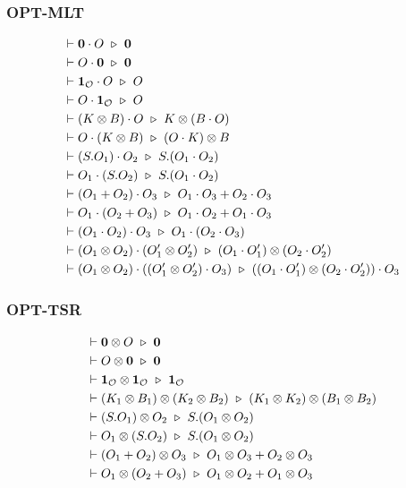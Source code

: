 \subsubsection*{\textsf{OPT-MLT}}
\begin{align*}
  & \vdash \mathbf{0} \cdot O \ \triangleright\  \mathbf{0} \\
  & \vdash O \cdot \mathbf{0} \ \triangleright\  \mathbf{0} \\
  & \vdash \mathbf{1}_\mathcal{O} \cdot O \ \triangleright\  O \\
  & \vdash O \cdot \mathbf{1}_\mathcal{O} \ \triangleright\  O \\
  & \vdash (K \otimes B) \cdot O \ \triangleright\  K \otimes (B \cdot O)\\
  & \vdash O \cdot (K \otimes B) \ \triangleright\  (O \cdot K) \otimes B\\
  & \vdash (S.O_1) \cdot O_2 \ \triangleright\  S.(O_1 \cdot O_2) \\
  & \vdash O_1 \cdot (S.O_2) \ \triangleright\  S.(O_1 \cdot O_2) \\
  & \vdash (O_1 + O_2) \cdot O_3 \ \triangleright\  O_1 \cdot O_3 + O_2 \cdot O_3 \\
  & \vdash O_1 \cdot (O_2 + O_3) \ \triangleright\  O_1 \cdot O_2 + O_1 \cdot O_3 \\
  & \vdash (O_1 \cdot O_2) \cdot O_3 \ \triangleright\  O_1 \cdot (O_2 \cdot O_3) \\
  & \vdash (O_1 \otimes O_2) \cdot (O_1' \otimes O_2') \ \triangleright\  (O_1 \cdot O_1') \otimes (O_2 \cdot O_2') \\
  & \vdash (O_1 \otimes O_2) \cdot ((O_1' \otimes O_2') \cdot O_3) \ \triangleright\  ((O_1 \cdot O_1') \otimes (O_2 \cdot O_2')) \cdot O_3
\end{align*}


\subsubsection*{\textsf{OPT-TSR}}
\begin{align*}
  & \vdash \mathbf{0} \otimes O \ \triangleright\  \mathbf{0} \\
  & \vdash O \otimes \mathbf{0} \ \triangleright\  \mathbf{0} \\
  & \vdash \mathbf{1}_\mathcal{O} \otimes \mathbf{1}_\mathcal{O} \ \triangleright\  \mathbf{1}_\mathcal{O} \\
  & \vdash (K_1 \otimes B_1) \otimes (K_2 \otimes B_2) \ \triangleright\  (K_1 \otimes K_2) \otimes (B_1 \otimes B_2) \\
  & \vdash (S.O_1) \otimes O_2 \ \triangleright\  S.(O_1 \otimes O_2) \\
  & \vdash O_1 \otimes (S.O_2) \ \triangleright\  S.(O_1 \otimes O_2) \\
  & \vdash (O_1 + O_2) \otimes O_3 \ \triangleright\  O_1 \otimes O_3 + O_2 \otimes O_3 \\
  & \vdash O_1 \otimes (O_2 + O_3) \ \triangleright\  O_1 \otimes O_2 + O_1 \otimes O_3
\end{align*}


